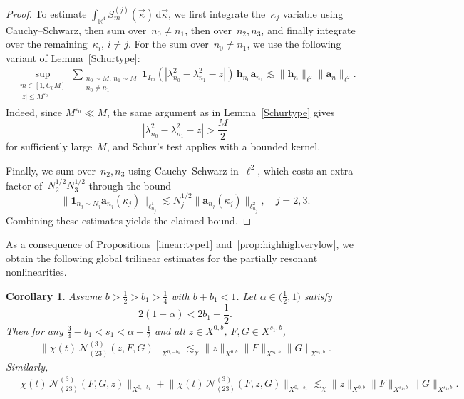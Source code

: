 \documentclass[11pt,reqno,english]{amsart}
\numberwithin{equation}{section}
\theoremstyle{plain}
\newtheorem{corollary}[theorem]{Corollary}
\theoremstyle{definition}
\theoremstyle{remark}
\renewcommand{\epsilon}{\varepsilon}
\begin{document}
\begin{proof}
	To estimate $\int_{\mathbb{R}^4}S_m^{(j)}(\vec{\kappa})\,\mathrm{d}\vec{\kappa}$, we first integrate the~$\kappa_j$ variable using Cauchy--Schwarz, then sum over~$n_0\neq n_1$, then over~$n_2,n_3$, and finally integrate over the remaining~$\kappa_i$, $i\neq j$. For the sum over~$n_0\neq n_1$, we use the following variant of Lemma~\ref{Schurtype}:
	\begin{align}\label{Schurtypevariant}
		\sup_{\substack{m\in[1,C_0 M]\\
				|z|\leq M^{\epsilon_0}
		}}\sum_{\substack{n_0\sim M,\, n_1\sim M\\
				n_0\neq n_1
		}} \mathbf{1}_{I_m}(|\lambda_{n_0}^2-\lambda_{n_1}^2-z|)\,\mathbf{h}_{n_0}\mathbf{a}_{n_1}\lesssim \|\mathbf{h}_n\|_{\ell^2}\|\mathbf{a}_n\|_{\ell^2}.
	\end{align}
	Indeed, since $M^{\epsilon_0}\ll M$, the same argument as in Lemma~\ref{Schurtype} gives
	\[
	|\lambda_{n_0}^2-\lambda_{n_1}^2-z|>\frac{M}{2}
	\]
	for sufficiently large~$M$, and Schur's test applies with a bounded kernel.

	Finally, we sum over~$n_2,n_3$ using Cauchy--Schwarz in~$\ell^2$, which costs an extra factor of~$N_2^{1/2}N_3^{1/2}$ through the bound
	\[
	\|\mathbf{1}_{n_j\sim N_j}\mathbf{a}_{n_j}(\kappa_j)\|_{\ell_{n_j}^1}\lesssim N_j^{1/2}\|\mathbf{a}_{n_j}(\kappa_j)\|_{\ell_{n_j}^2}, \quad j=2,3.
	\]
	Combining these estimates yields the claimed bound.
\end{proof}

As a consequence of Propositions~\ref{linear:type1} and~\ref{prop:highhighverylow}, we obtain the following global trilinear estimates for the partially resonant nonlinearities.

\begin{corollary}\label{cor:pres1}
	Assume $b>\frac{1}{2}>b_1>\frac{1}{4}$ with $b+b_1<1$. Let $\alpha\in\big(\frac{1}{2},1\big)$ satisfy
	\[
	2(1-\alpha)<2b_1-\frac{1}{2}.
	\]
	Then for any $\frac{3}{4}-b_1<s_1<\alpha-\frac{1}{2}$ and all $z\in X^{0,b}$, $F,G\in X^{s_1,b}$,
	\begin{align}\label{pres1-1}
		\Big\|
		\chi(t)\,\mathcal{N}_{(23)}^{(3)}(z,F,G)
		\Big\|_{X^{0,-b_1}}\lesssim_{\chi} \|z\|_{X^{0,b}}\|F\|_{X^{s_1,b}}\|G\|_{X^{s_1,b}}.
	\end{align}
	Similarly,
	\begin{align}\label{pres1-2}
		\Big\|
		\chi(t)\,\mathcal{N}_{(23)}^{(3)}(F,G,z)
		\Big\|_{X^{0,-b_1}}
		+
		\Big\|
		\chi(t)\,\mathcal{N}_{(23)}^{(3)}(F,z,G)
		\Big\|_{X^{0,-b_1}}
		\lesssim_{\chi} \|z\|_{X^{0,b}}\|F\|_{X^{s_1,b}}\|G\|_{X^{s_1,b}}.
	\end{align}
\end{corollary}
\end{document}
